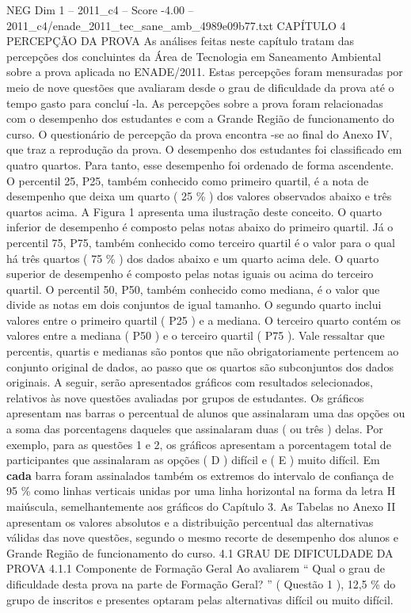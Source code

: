 \begin{textsample}{NEG Dim 1 – 2011\_c4 – Score -4.00 – 2011\_c4/enade\_2011\_tec\_sane\_amb\_4989e09b77.txt}  \label{ex:f1_neg_114}
CAPÍTULO 4 PERCEPÇÃO DA PROVA As análises feitas neste capítulo tratam das percepções dos concluintes da Área de Tecnologia em Saneamento Ambiental sobre a prova aplicada no ENADE/2011.
Estas percepções foram mensuradas por meio de nove questões que avaliaram desde o grau de dificuldade da prova até o tempo gasto para concluí -la.
As percepções sobre a prova foram relacionadas com o desempenho dos estudantes e com a Grande Região de funcionamento do curso.
O questionário de percepção da prova encontra -se ao final do Anexo IV, que traz a reprodução da prova.
O desempenho dos estudantes foi classificado em quatro quartos.
Para tanto, esse desempenho foi ordenado de forma ascendente.
O percentil 25, P25, também conhecido como primeiro quartil, é a nota de desempenho que deixa um quarto ( 25 \% ) dos valores observados abaixo e três quartos acima.
A Figura 1 apresenta uma ilustração deste conceito.
O quarto inferior de desempenho é composto pelas notas abaixo do primeiro quartil.
Já o percentil 75, P75, também conhecido como terceiro quartil é o valor para o qual há três quartos ( 75 \% ) dos dados abaixo e um quarto acima dele.
O quarto superior de desempenho é composto pelas notas iguais ou acima do terceiro quartil.
O percentil 50, P50, também conhecido como mediana, é o valor que divide as notas em dois conjuntos de igual tamanho.
O segundo quarto inclui valores entre o primeiro quartil ( P25 ) e a mediana.
O terceiro quarto contém os valores entre a mediana ( P50 ) e o terceiro quartil ( P75 ).
Vale ressaltar que percentis, quartis e medianas são pontos que não obrigatoriamente pertencem ao conjunto original de dados, ao passo que os quartos são subconjuntos dos dados originais.
A seguir, serão apresentados gráficos com resultados selecionados, relativos às nove questões avaliadas por grupos de estudantes.
Os gráficos apresentam nas barras o percentual de alunos que assinalaram uma das opções ou a soma das porcentagens daqueles que assinalaram duas ( ou três ) delas.
Por exemplo, para as questões 1 e 2, os gráficos apresentam a porcentagem total de participantes que assinalaram as opções ( D ) difícil e ( E ) muito difícil.
Em \textbf{cada} barra foram assinalados também os extremos do intervalo de confiança de 95 \% como linhas verticais unidas por uma linha horizontal na forma da letra H maiúscula, semelhantemente aos gráficos do Capítulo 3.
As Tabelas no Anexo II apresentam os valores absolutos e a distribuição percentual das alternativas válidas das nove questões, segundo o mesmo recorte de desempenho dos alunos e Grande Região de funcionamento do curso. 4.1 GRAU DE DIFICULDADE DA PROVA 4.1.1 Componente de Formação Geral Ao avaliarem “ Qual o grau de dificuldade desta prova na parte de Formação Geral? ” ( Questão 1 ), 12,5 \% do grupo de inscritos e presentes optaram pelas alternativas difícil ou muito difícil.

\end{textsample}
